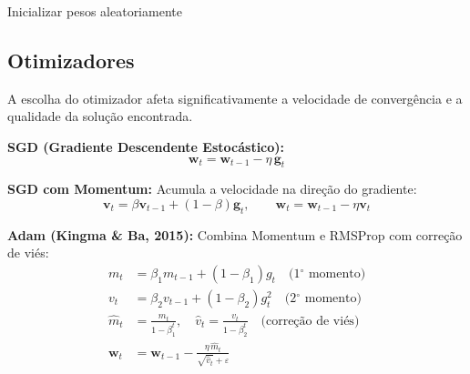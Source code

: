 \documentclass[12pt,a4paper]{article}
\begin{document}
\begin{algorithm}[H]
\caption{Backpropagation: Treinamento de MLP}
Inicializar pesos aleatoriamente \;
\end{algorithm}

\subsection{Otimizadores}

A escolha do otimizador afeta significativamente a velocidade de convergência e a qualidade da solução encontrada.

\textbf{SGD (Gradiente Descendente Estocástico):}
\[
  \mathbf{w}_t = \mathbf{w}_{t-1} - \eta \, \mathbf{g}_t
\]

\textbf{SGD com Momentum:} Acumula a velocidade na direção do gradiente:
\[
  \mathbf{v}_t = \beta \mathbf{v}_{t-1} + (1-\beta)\mathbf{g}_t, \qquad \mathbf{w}_t = \mathbf{w}_{t-1} - \eta \mathbf{v}_t
\]

\textbf{Adam (Kingma \& Ba, 2015):} Combina Momentum e RMSProp com correção de viés:
\begin{align}
  m_t &= \beta_1 m_{t-1} + (1-\beta_1) g_t \quad \text{(1$^\circ$ momento)}\\
  v_t &= \beta_2 v_{t-1} + (1-\beta_2) g_t^2 \quad \text{(2$^\circ$ momento)}\\
  \hat{m}_t &= \frac{m_t}{1-\beta_1^t}, \quad \hat{v}_t = \frac{v_t}{1-\beta_2^t} \quad \text{(correção de viés)}\\
  \mathbf{w}_t &= \mathbf{w}_{t-1} - \frac{\eta \, \hat{m}_t}{\sqrt{\hat{v}_t} + \varepsilon}
\end{align}
\end{document}
